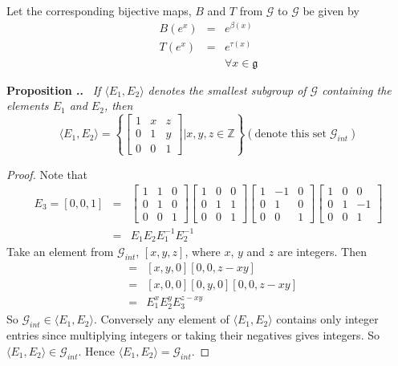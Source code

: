\documentclass[honours]{UNSWthesis}
\newcommand{\Z}{\mathbb{Z}}
\newcommand{\G}{\mathcal{G}}
\newcommand{\g}{\mathfrak{g}}
\newcommand{\1}{\mathbf{e}_{1}}
\newcommand{\2}{\mathbf{e}_{3}}
\newcommand{\3}{\mathbf{e}_{3}}
\newcounter{Item}[section]
\newenvironment{Proposition}{\medskip
                            \refstepcounter{Item}
                            \noindent
                           {\bf Proposition \thesection.\theItem.}\ %
                            \begingroup \sl}
                           {\endgroup\medskip}
\begin{document}
Let the corresponding bijective maps, $B$ and $T$ from $\G$ to $\G$ be given by
\begin{eqnarray*}
B(e^{x}) &=& e^{\beta(x)} \\
T(e^{x}) &=& e^{\tau (x)} \\
& & \forall x \in \g
\end{eqnarray*}

\begin{Proposition}
If $\langle E_{1},E_{2} \rangle$ denotes the smallest subgroup of $\G$ containing the elements $E_{1}$ and $E_{2}$, then 
\[
\langle E_{1},E_{2} \rangle = 
\left\lbrace
\begin{bmatrix}
1 & x & z \\
0 & 1 & y \\
0 & 0 & 1
\end{bmatrix} \bigg|x,y,z \in \Z
\right\rbrace (\text{denote this set}\;\G_{int})
\]
\end{Proposition}

\begin{proof}
Note that 
\begin{eqnarray*}
E_{3}=[0,0,1]&=&
\begin{bmatrix}
1 & 1 & 0 \\
0 & 1 & 0 \\
0 & 0 & 1
\end{bmatrix}
\begin{bmatrix}
1 & 0 & 0 \\
0 & 1 & 1 \\
0 & 0 & 1
\end{bmatrix}
\begin{bmatrix}
1 & -1 & 0 \\
0 & 1 & 0 \\
0 & 0 & 1
\end{bmatrix}
\begin{bmatrix}
1 & 0 & 0 \\
0 & 1 & -1 \\
0 & 0 & 1
\end{bmatrix}
 \\
&=& E_{1}E_{2}E_{1}^{-1}E_{2}^{-1}
\end{eqnarray*}
Take an element from $\G_{int}$, $[x,y,z]$, where $x$, $y$ and $z$ are integers. Then 
\begin{eqnarray*}
[x,y,z] &=&[x,y,0][0,0,z-xy] \\
&=& [x,0,0][0,y,0][0,0,z-xy] \\
&=& E_{1}^{x}E_{2}^{y}E_{3}^{z-xy}
\end{eqnarray*}
So $\G_{int} \in \langle E_{1},E_{2} \rangle $. Conversely any element of $\langle E_{1},E_{2} \rangle$ contains only integer entries since multiplying integers or taking their negatives gives integers. So $\langle E_{1},E_{2} \rangle \in \G_{int}$. Hence $\langle E_{1},E_{2} \rangle=\G_{int}$.
\end{proof}
\end{document}
